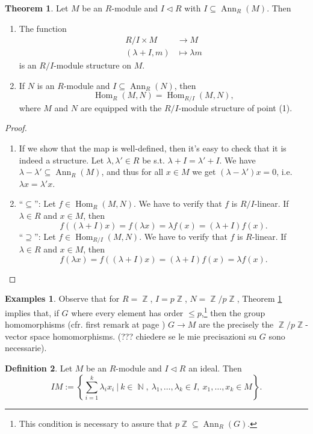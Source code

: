 \documentclass[12pt,a4paper]{report}
\theoremstyle{definition}
\newtheorem{theorem}{Theorem}[chapter] %
\newtheorem{defn}[theorem]{Definition}
\newtheorem*{examples}{Examples}
\theoremstyle{num.custom-title}
\DeclareMathOperator{\Hom}{Hom}
\DeclareMathOperator{\Ann}{Ann}
\DeclareMathOperator{\N}{\mathbb{N}}
\DeclareMathOperator{\Z}{\mathbb{Z}}
\DeclareMathOperator{\sse}{\subseteq}
\begin{document}
\begin{theorem}\label{thm-equiv-hom}
Let $M$ be an $R$-module and $I \lhd R$ with $I \sse \Ann_R(M)$. Then
\begin{enumerate}
\item The function
\begin{align*}
R/I \times M &\to M \\
(\lambda + I, m) &\mapsto \lambda m
\end{align*}
is an $R/I$-module structure on $M$.
\item If $N$ is an $R$-module and $I \sse \Ann_R(N)$, then
\[
\Hom_R(M,N) = \Hom_{R/I}(M,N),
\]
where $M$ and $N$ are equipped with the $R/I$-module structure of point (1).
\end{enumerate}
\begin{proof}\ 
\begin{enumerate}
\item If we show that the map is well-defined, then it's easy to check that it is indeed a structure. Let $\lambda,\lambda' \in R$ be s.t. $\lambda + I = \lambda' + I$. We have $\lambda - \lambda' \sse \Ann_R(M)$, and thus for all $x \in M$ we get $(\lambda-\lambda')x=0$, i.e. $\lambda x = \lambda' x$.
\item ``$\sse$'': Let $f \in \Hom_R(M,N)$. We have to verify that $f$ is $R/I$-linear. If $\lambda \in R$ and $x \in M$, then
\[
f((\lambda + I)x) = f(\lambda x) = \lambda f(x) = (\lambda + I) f(x).
\]
``$\supseteq$'': Let $f \in \Hom_{R/I}(M,N)$. We have to verify that $f$ is $R$-linear. If $\lambda \in R$ and $x \in M$, then
\[
f(\lambda x) = f((\lambda + I)x) = (\lambda + I) f(x) = \lambda f(x).
\]
\end{enumerate}
\end{proof}
\end{theorem}

\begin{examples}
Observe that for $R=\Z$, $I=p\Z$, $N=\Z/p\Z$, Theorem \ref{thm-equiv-hom} implies that, if $G$ where every element has order $\leq p$,\footnote{This condition is necessary to assure that $p\Z \sse \Ann_R(G)$.} then the group homomorphisms (cfr. first remark at page \pageref{Z-hom=goup_hom}) $G \to M$ are the precisely the $\Z/p\Z$-vector space homomorphisms. (??? chiedere se le mie precisazioni su $G$ sono necessarie).
\end{examples}

\begin{defn}
Let $M$ be an $R$-module and $I \lhd R$ an ideal. Then
\[
IM := \left\{ \sum_{i=1}^k \lambda_i x_i \ \Bigg| \ k \in \N, \ \lambda_1,\ldots,\lambda_k \in I, \ x_1,\ldots,x_k \in M \right\}.
\]
\end{defn}
\end{document}
